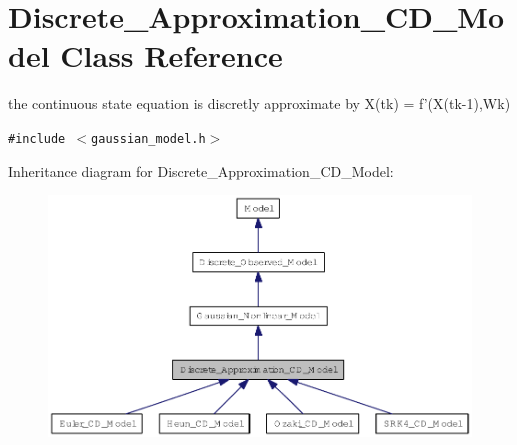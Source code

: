 \hypertarget{class_discrete___approximation___c_d___model}{
\section{Discrete\_\-Approximation\_\-CD\_\-Model Class Reference}
\label{class_discrete___approximation___c_d___model}
}
the continuous state equation is discretly approximate by X(tk) = f'(X(tk-1),Wk)  


{\tt \#include $<$gaussian\_\-model.h$>$}

Inheritance diagram for Discrete\_\-Approximation\_\-CD\_\-Model:\nopagebreak
\begin{figure}[H]
\begin{center}
\leavevmode
\includegraphics[width=400pt]{class_discrete___approximation___c_d___model__inherit__graph}
\end{center}
\end{figure}

